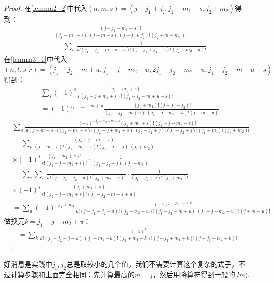 \begin{proof}
在\ref{lemma2_2}中代入$(n,m,s)=(j-j_1+j_2,j_1-m_1-s,j_2+m_2)$得到：
\begin{align*}
    &\frac{(j+j_2-m_1-s)!} {(j_1-m_1-s)!(j-m-s)!(j-j_1+j_2)!(j_2+m-m_1)!}\\
    &=\sum_u\frac{1}{u!(j_1-j_2-m-s+u)!(j-j_1+j_2-u)!(j_2+m_2-u)!}
\end{align*}
在\ref{lemma3_1}中代入$(n,t,s,r)=(j_1-j_2-m+u,j_1-j-m_2+u,2j_1-j_2-m_2-u,j_1-j_2-m-u-s)$得到：
\begin{align*}
    &\sum_s (-1)^s \frac{(j_1+m_1+s)!} {s!(j_2-j+m_1+s)!(j_1-j_2-m+u-s)!}\\
&=(-1)^{j_1-j_2-m+u}\frac{(j_1+m_1)!(j+j_1-j_2)!}{(j_1-j_2-m+u)!(j_1-j-m_2+u)!(j+m-u)!}
\end{align*}
\begin{align*}
    &\sum_{s} \frac{(-1)^{-j_1 - m_2+m+s} (j_1 + m_1 + s)!(j_2+j-m_1-s)!}{s!(j - m - s)!(j_1 - m_1-s)!(j_2-j+m_1+s)!(j_2-j_1+j)!(j_1-j_2 + j)!(j_1 + m_1)!(j_2 + m_2)!}\\
    &=\sum_{s}\frac{(j_2+j-m_1-s)!}{(j - m - s)!(j_1 - m_1-s)!(j_2-j_1+j)!(j_2 + m_2)!}\\
    &\times(-1)^{s}\frac{(j_1 + m_1 + s)!}{s!(j_2-j+m_1+s)!}\cdot \frac{1}{(j_1-j_2 + j)!(j_1 + m_1)!}\\
    &=\sum_{s}\sum_{u} \frac{1}{u!(j-j_1+j_2-u)!(j_2+m_2-u)!}\cdot \frac{1}{(j_1-j_2 + j)!(j_1 + m_1)!}\\
    &\times(-1)^{s}\frac{(j_1 + m_1 + s)!}{s!(j_2-j+m_1+s)!(j_1-j_2-m-s+u)!}\\
    &=\sum_{u}(-1)^{-j_1+m_1}\frac{(-1)^{j_1-j_2-m+u}}{u!(j-j_1+j_2-u)!(j_2+m_2-u)!(j_1-j_2-m+u)!(j_1-j-m_2+u)!(j+m-u)!}
\end{align*}
做换元$k=j_1-j-m_2+u$：
\begin{align*}
    =\sum_{k}\frac{(-1)^{k}}{k!(j_1+j_2-j-k)!(j_1-m_1-k)!(j_2+m_2-k)!(j-j_2+m_1+k)!(j-j_1-m_2+k)!}
\end{align*}
\end{proof}
好消息是实践中$j_1,j_2$总是取较小的几个值，我们不需要计算这个复杂的式子，不过计算步骤和上面完全相同：先计算最高的$m=j$，然后用降算符得到一般的$|lm\rangle$.
